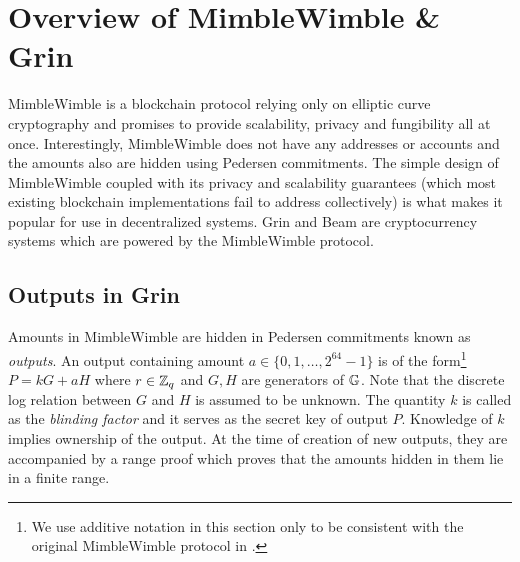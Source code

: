 \section{Overview of MimbleWimble \& Grin}
\label{scn:grin_overview}

MimbleWimble \cite{Poelstra2016} is a blockchain protocol relying only on elliptic curve cryptography and promises to provide scalability, privacy and fungibility all at once.
Interestingly, MimbleWimble does not have any addresses or accounts and the amounts also are hidden using Pedersen commitments.
The simple design of MimbleWimble coupled with its privacy and scalability guarantees (which most existing blockchain implementations fail to address collectively) is what makes it popular for use in decentralized systems.
Grin \cite{GrinWebsite} and Beam \cite{BeamWebsite} are cryptocurrency systems which are powered by the MimbleWimble protocol.

\subsection{Outputs in Grin}

Amounts in MimbleWimble are hidden in Pedersen commitments known as \textit{outputs}.
An output containing amount $a \in \{0,1,\dots, 2^{64}-1\}$ is of the form\footnote{We use additive notation in this section only to be consistent with the original MimbleWimble protocol in \cite{Poelstra2016}.} $P = kG + aH$ where $r \in \mathbb{Z}_q$ and $G,H$ are generators of $\mathbb{G}$.
Note that the discrete log relation between $G$ and $H$ is assumed to be unknown.
The quantity $k$ is called as the \textit{blinding factor} and it serves as the secret key of output $P$.
Knowledge of $k$ implies ownership of the output.
At the time of creation of new outputs, they are accompanied by a range proof which proves that the amounts hidden in them lie in a finite range.

